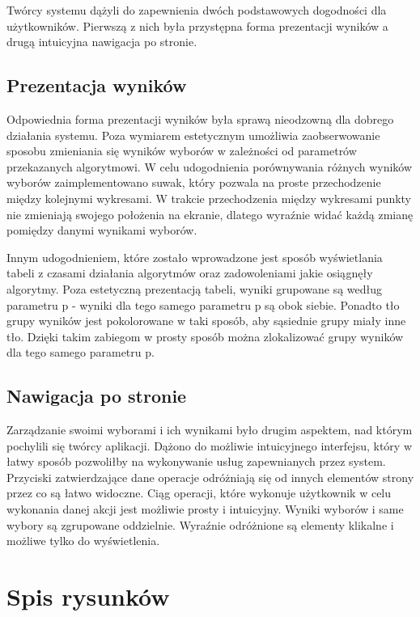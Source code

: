 \documentclass[pdflatex,11pt]{../aghdoc_version2}
\newlength\tindent
\renewcommand{\indent}{\hspace*{\tindent}}
\begin{document}
Twórcy systemu dążyli do zapewnienia dwóch podstawowych dogodności dla użytkowników. Pierwszą z nich była przystępna forma prezentacji wyników a drugą intuicyjna nawigacja po stronie.

\section{Prezentacja wyników}
Odpowiednia forma prezentacji wyników była sprawą nieodzowną dla dobrego działania systemu. Poza wymiarem estetycznym umożliwia zaobserwowanie sposobu zmieniania się wyników wyborów w zależności od parametrów przekazanych algorytmowi. W celu udogodnienia porównywania różnych wyników wyborów zaimplementowano suwak, który pozwala na proste przechodzenie między kolejnymi wykresami. W trakcie przechodzenia między wykresami punkty nie zmieniają swojego położenia na ekranie, dlatego wyraźnie widać każdą zmianę pomiędzy danymi wynikami wyborów.
 
\indent Innym udogodnieniem, które zostało wprowadzone jest sposób wyświetlania tabeli z czasami działania algorytmów oraz zadowoleniami jakie osiągnęły algorytmy. Poza estetyczną prezentacją tabeli, wyniki grupowane są według parametru p - wyniki dla tego samego parametru p są obok siebie. Ponadto tło grupy wyników jest pokolorowane w taki sposób, aby sąsiednie grupy miały inne tło. Dzięki takim zabiegom w prosty sposób można zlokalizować grupy wyników dla tego samego parametru p.

\section{Nawigacja po stronie}

Zarządzanie swoimi wyborami i ich wynikami było drugim aspektem, nad którym pochylili się twórcy aplikacji. Dążono do możliwie intuicyjnego interfejsu, który w łatwy sposób pozwoliłby na wykonywanie usług zapewnianych przez system. Przyciski zatwierdzające dane operacje odróżniają się od innych elementów strony przez co są łatwo widoczne. Ciąg operacji, które wykonuje użytkownik w celu wykonania danej akcji jest możliwie prosty i intuicyjny. Wyniki wyborów i same wybory są zgrupowane oddzielnie. Wyraźnie odróżnione są elementy klikalne i możliwe tylko do wyświetlenia.

\chapter{Spis rysunków}
\label{cha:rysunki}





\end{document}
